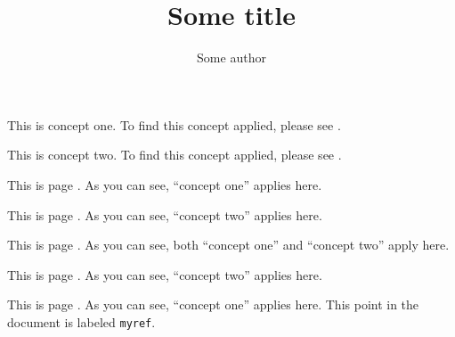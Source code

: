 \documentclass{article}
\begin{document}
\title{Some title}

\author{Some author}

\maketitle

This is concept one. To find this concept applied, please
see .

This is concept two. To find this concept applied, please
see .\newpage

 This is page \thepage. As you can see,
``concept one'' applies here.\newpage

 This is page \thepage. As you can see,
``concept two'' applies here.\newpage

 This is page \thepage. As you
can see, both ``concept one'' and ``concept two'' apply here.\newpage

 This is page \thepage. As you can see,
``concept two'' applies here.\newpage

 This is page \thepage. As you can
see, ``concept one'' applies here. This point in the document is
labeled \texttt{myref}.
\end{document}
